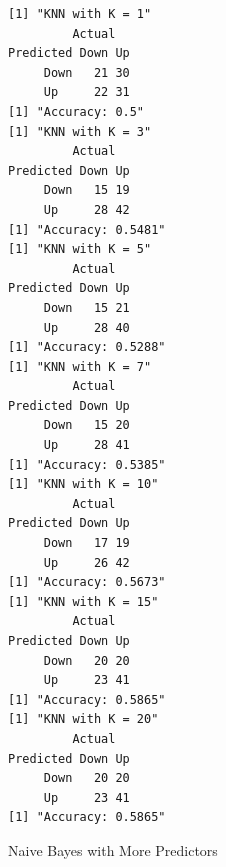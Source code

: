 \documentclass[
]{article}
\newenvironment{Shaded}{\begin{snugshade}}{\end{snugshade}}
\newcommand{\AttributeTok}[1]{\textcolor[rgb]{0.40,0.45,0.13}{#1}}
\newcommand{\CommentTok}[1]{\textcolor[rgb]{0.37,0.37,0.37}{#1}}
\newcommand{\FunctionTok}[1]{\textcolor[rgb]{0.28,0.35,0.67}{#1}}
\newcommand{\NormalTok}[1]{\textcolor[rgb]{0.00,0.23,0.31}{#1}}
\newcommand{\OtherTok}[1]{\textcolor[rgb]{0.00,0.23,0.31}{#1}}
\newcommand{\SpecialCharTok}[1]{\textcolor[rgb]{0.37,0.37,0.37}{#1}}
\begin{document}
\begin{verbatim}
[1] "KNN with K = 1"
         Actual
Predicted Down Up
     Down   21 30
     Up     22 31
[1] "Accuracy: 0.5"
[1] "KNN with K = 3"
         Actual
Predicted Down Up
     Down   15 19
     Up     28 42
[1] "Accuracy: 0.5481"
[1] "KNN with K = 5"
         Actual
Predicted Down Up
     Down   15 21
     Up     28 40
[1] "Accuracy: 0.5288"
[1] "KNN with K = 7"
         Actual
Predicted Down Up
     Down   15 20
     Up     28 41
[1] "Accuracy: 0.5385"
[1] "KNN with K = 10"
         Actual
Predicted Down Up
     Down   17 19
     Up     26 42
[1] "Accuracy: 0.5673"
[1] "KNN with K = 15"
         Actual
Predicted Down Up
     Down   20 20
     Up     23 41
[1] "Accuracy: 0.5865"
[1] "KNN with K = 20"
         Actual
Predicted Down Up
     Down   20 20
     Up     23 41
[1] "Accuracy: 0.5865"
\end{verbatim}

Naive Bayes with More Predictors

\begin{Shaded}
\end{Shaded}
\end{document}
